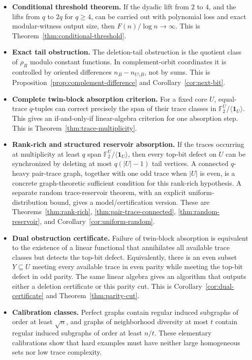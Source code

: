 \documentclass[thmsec,dntnbr,nolinenbrs]{dmgt}
\numberwithin{equation}{section}
\newcommand{\F}{\mathbb{F}}
\newcommand{\one}{\mathbf{1}}
\begin{document}
\begin{itemize}[leftmargin=*]
    \item \textbf{Conditional threshold theorem.}  If the dyadic lift from \(2\) to \(4\), and the lifts from \(q\) to \(2q\) for \(q\ge 4\), can be carried out with polynomial loss and exact modular-witness output size, then \(F(n)/\log n\to\infty\).  This is Theorem~\ref{thm:conditional-threshold}.
    \item \textbf{Exact tail obstruction.}  The deletion-tail obstruction is the quotient class of \(\rho_R\) modulo constant functions.  In complement-orbit coordinates it is controlled by oriented differences \(n_B-n_{U\setminus B}\), not by sums.  This is Proposition~\ref{prop:complement-difference} and Corollary~\ref{cor:next-bit}.
    \item \textbf{Complete twin-block absorption criterion.}  For a fixed core \(U\), equal-trace \(q\)-tuples can correct precisely the span of their trace classes in \(\F_2^U/\langle \one_U\rangle\).  This gives an if-and-only-if linear-algebra criterion for one absorption step.  This is Theorem~\ref{thm:trace-multiplicity}.
    \item \textbf{Rank-rich and structured reservoir absorption.}  If the traces occurring at multiplicity at least \(q\) span \(\F_2^U/\langle \one_U\rangle\), then every top-bit defect on \(U\) can be synchronized by deleting at most \(q(|U|-1)\) tail vertices.  A connected \(q\)-heavy pair-trace graph, together with one odd trace when \(|U|\) is even, is a concrete graph-theoretic sufficient condition for this rank-rich hypothesis.  A separate random trace-reservoir theorem, with an explicit uniform-distribution bound, gives a model/certification version.  These are Theorems~\ref{thm:rank-rich}, \ref{thm:pair-trace-connected}, \ref{thm:random-reservoir}, and Corollary~\ref{cor:uniform-random}.
    \item \textbf{Dual obstruction certificate.}  Failure of twin-block absorption is equivalent to the existence of a linear functional that annihilates all available trace classes but detects the top-bit defect.  Equivalently, there is an even subset \(Y\subseteq U\) meeting every available trace in even parity while meeting the top-bit defect in odd parity.  The same linear algebra gives an algorithm that outputs either a deletion certificate or this parity cut.  This is Corollary~\ref{cor:dual-certificate} and Theorem~\ref{thm:parity-cut}.
    \item \textbf{Calibration classes.}  Perfect graphs contain regular induced subgraphs of order at least \(\sqrt n\), and graphs of neighborhood diversity at most \(t\) contain regular induced subgraphs of order at least \(n/t\).  These elementary calibrations show that hard examples must have neither large homogeneous sets nor low trace complexity.
\end{itemize}
\end{document}
